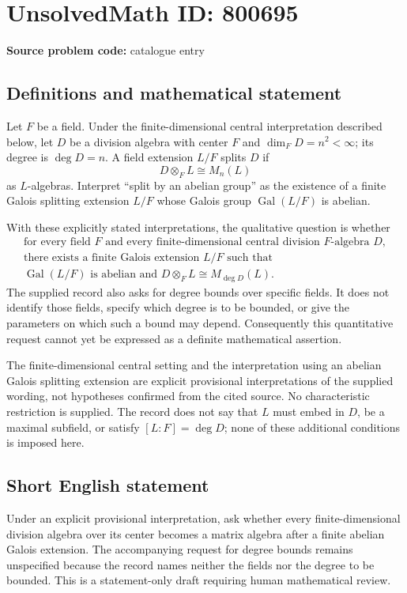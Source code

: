 \documentclass[11pt]{article}
\begin{document}
\section*{UnsolvedMath ID: 800695}
\textbf{Source problem code:} catalogue entry
\subsection{Definitions and mathematical statement}
Let \(F\) be a field. Under the finite-dimensional central interpretation described below, let \(D\) be a division algebra with center \(F\) and \(\dim_F D=n^2<\infty\); its degree is \(\deg D=n\). A field extension \(L/F\) splits \(D\) if
\[
D\otimes_F L\cong M_n(L)
\]
as \(L\)-algebras. Interpret ``split by an abelian group'' as the existence of a finite Galois splitting extension \(L/F\) whose Galois group \(\operatorname{Gal}(L/F)\) is abelian.

With these explicitly stated interpretations, the qualitative question is whether
\[
\begin{gathered}
\text{for every field }F\text{ and every finite-dimensional central division }F\text{-algebra }D,\\
\text{there exists a finite Galois extension }L/F\text{ such that}\\
\operatorname{Gal}(L/F)\text{ is abelian and }D\otimes_F L\cong M_{\deg D}(L).
\end{gathered}
\]
The supplied record also asks for degree bounds over specific fields. It does not identify those fields, specify which degree is to be bounded, or give the parameters on which such a bound may depend. Consequently this quantitative request cannot yet be expressed as a definite mathematical assertion.

The finite-dimensional central setting and the interpretation using an abelian Galois splitting extension are explicit provisional interpretations of the supplied wording, not hypotheses confirmed from the cited source. No characteristic restriction is supplied. The record does not say that \(L\) must embed in \(D\), be a maximal subfield, or satisfy \([L:F]=\deg D\); none of these additional conditions is imposed here.
\subsection{Short English statement}
Under an explicit provisional interpretation, ask whether every finite-dimensional division algebra over its center becomes a matrix algebra after a finite abelian Galois extension. The accompanying request for degree bounds remains unspecified because the record names neither the fields nor the degree to be bounded. This is a statement-only draft requiring human mathematical review.
\end{document}
